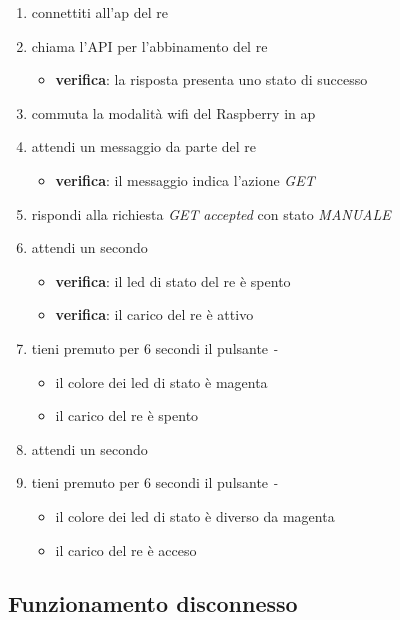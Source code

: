 \documentclass[12pt,a4paper,twoside,titlepage]{book}
\begin{document}
\begin{enumerate}
    \item connettiti all'\acrshort{ap} del \acrshort{re}
    \item chiama l'API per l'abbinamento del \acrshort{re} 
    \begin{itemize}
        \item \textbf{verifica}: la risposta presenta uno stato di successo 
    \end{itemize}
    \item commuta la modalità \Gls{wifi} del Raspberry in \acrshort{ap}
    \item attendi un messaggio da parte del \acrshort{re}
    \begin{itemize}
        \item \textbf{verifica}: il messaggio indica l'azione \textit{GET}
    \end{itemize}
    \item rispondi alla richiesta \textit{GET} \textit{accepted} con stato \textit{MANUALE}
    \item attendi un secondo 
    \begin{itemize}
        \item \textbf{verifica}: il \acrshort{led} di stato del \acrshort{re} è spento 
        \item \textbf{verifica}: il carico del \acrshort{re} è attivo 
    \end{itemize}
    \item tieni premuto per 6 secondi il pulsante \textit{-}
    \begin{itemize}
        \item il colore dei led di stato è magenta
        \item il carico del \acrshort{re} è spento 
    \end{itemize}
    \item attendi un secondo 
    \item tieni premuto per 6 secondi il pulsante \textit{-}
    \begin{itemize}
        \item il colore dei led di stato è diverso da magenta 
        \item il carico del \acrshort{re} è acceso
    \end{itemize}
\end{enumerate}

\subsection{Funzionamento disconnesso}
\label{section:test_offline_working}
\end{document}
